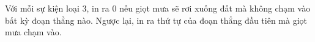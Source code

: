 Với mỗi sự kiện loại 3, in ra 0 nếu giọt mưa sẽ rơi xuống đất mà không chạm vào bất kỳ đoạn thẳng nào. Ngược lại, in ra thứ tự của đoạn thẳng đầu tiên mà giọt mưa chạm vào.